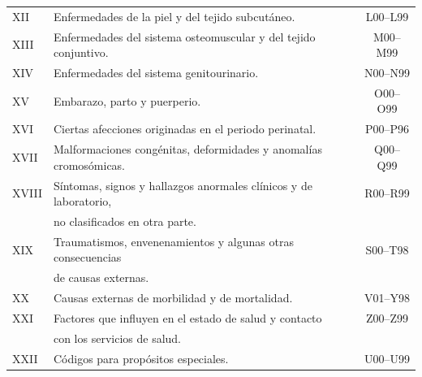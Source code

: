 \begin{tabular}{llc}
XII             & Enfermedades de la piel y del tejido subcutáneo.                                                                           & L00–L99                 \\
XIII            & Enfermedades del sistema osteomuscular y del tejido conjuntivo.                                                            & M00–M99                 \\
XIV             & Enfermedades del sistema genitourinario.                                                                                   & N00–N99                 \\
XV              & Embarazo, parto y puerperio.                                                                                               & O00–O99                 \\
XVI             & Ciertas afecciones originadas en el periodo perinatal.                                                                     & P00–P96                 \\
XVII            & Malformaciones congénitas, deformidades y anomalías cromosómicas.                                                          & Q00–Q99                 \\
XVIII           & Síntomas, signos y hallazgos anormales clínicos y de laboratorio, & R00–R99\\ 
& no clasificados en otra parte. &     \\
XIX             & Traumatismos, envenenamientos y algunas otras consecuencias & S00–T98 \\
& de causas externas.  &            \\
XX              & Causas externas de morbilidad y de mortalidad.                                                                             & V01–Y98                 \\
XXI             & Factores que influyen en el estado de salud y contacto & Z00–Z99 \\ 
& con los  servicios de salud.  &     \\
XXII            & Códigos para propósitos especiales.                                                                                        & U00–U99 \\
\hline
\end{tabular}
